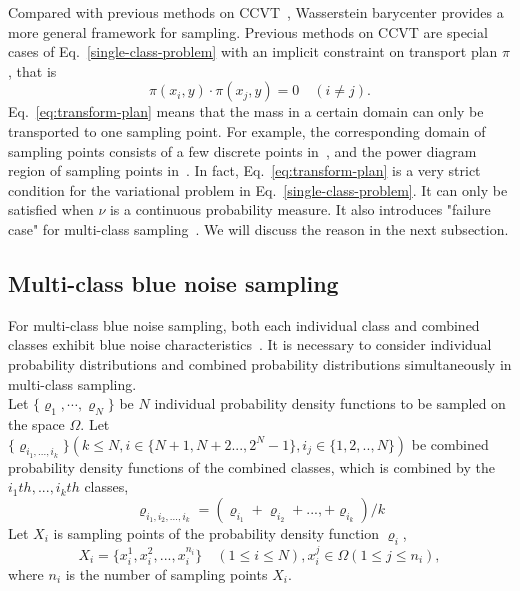 Compared with previous methods on CCVT~\cite{balzer:2009:capacity,de:2012:blue},
Wasserstein barycenter provides a more general framework for sampling.
Previous methods on CCVT are special cases of Eq.~\ref{single-class-problem} with an implicit constraint on  transport plan $\pi$,
that is
\begin{equation}\label{eq:transform-plan}
  \pi(x_i,y)\cdot\pi(x_j,y)=0 \quad(i\neq j).
\end{equation}
Eq.~\ref{eq:transform-plan} means that the mass in a certain domain can only be transported to one sampling point.
For example,
the corresponding domain of sampling points consists of a few discrete points in~\cite{balzer:2009:capacity},
and the power diagram region of sampling points in~\cite{de:2012:blue}.
In fact,
Eq.~\ref{eq:transform-plan} is a very strict condition for the variational problem in Eq.~\ref{single-class-problem}.
It can only be satisfied when $\nu$ is a continuous probability measure.
It also introduces "failure case" for multi-class sampling~\cite{wei:2010:multi}.
We will discuss the reason in the next subsection.

\subsection{Multi-class blue noise sampling}
For multi-class blue noise sampling,
both each individual class and combined classes exhibit blue noise characteristics~\cite{wei:2010:multi}.
It is necessary to consider individual probability distributions and combined probability distributions simultaneously
in multi-class sampling. \\
Let $\{\varrho_1,\cdots,\varrho_N\}$ be $N$ individual probability density functions
to be sampled on the space $\Omega$.
Let $\{\varrho_{{i}_1,...,i_k}\}(k\leq N, i\in\{N+1,N+2...,2^N-1\},i_j\in\{1,2,..,N\})$
be combined probability density functions of the combined classes,
which is combined by  the $i_1th,...,i_kth$ classes,
\begin{equation*}
    \varrho_{i_1,i_2,...,i_k}=(\varrho_{i_1}+\varrho_{i_2}+...,+\varrho_{i_k})/k
\end{equation*}
Let $X_i$ is sampling points of the probability density function $\varrho_i$,
\begin{equation*}
  X_i=\{x_i^1,x_i^2,...,x_i^{n_i}\}\quad(1\leq i\leq N), x_i^j\in\Omega(1\leq j\leq n_i),
\end{equation*}
where $n_i$ is the number of sampling points $X_i$.

